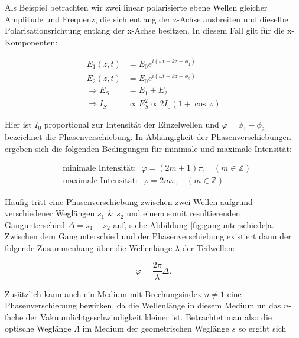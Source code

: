 \documentclass{article}
\begin{document}
Als Beispiel betrachten wir zwei linear polarisierte ebene Wellen gleicher Amplitude und Frequenz, die sich entlang der z-Achse ausbreiten und dieselbe Polarisationsrichtung entlang der x-Achse besitzen. In diesem Fall gilt für die x-Komponenten:

\begin{equation}
    \begin{split}
        E_1 (z, t) &= E_0 e^{i(\omega t - kz + \phi_1)} \\
        E_2 (z, t) &= E_0 e^{i(\omega t - kz + \phi_2)} \\
        \Rightarrow E_S &= E_1 + E_2 \\
        \Rightarrow I_S &\propto E_S^2 \propto 2 I_0 (1+ \cos{\varphi})
    \end{split}
\end{equation}

Hier ist $I_0$ proportional zur Intensität der Einzelwellen und $\varphi = \phi_1 - \phi_2$ bezeichnet die Phasenverschiebung. In Abhängigkeit der Phasenverschiebungen ergeben sich die folgenden Bedingungen für minimale und maximale Intensität:

\begin{equation}
    \begin{split}
        &\text{minimale Intensität:} \ \ \ \varphi = (2m+1) \pi, \ \ \ \ (m \in \mathbb{Z}) \\
        &\text{maximale Intensität:} \ \ \ \varphi = 2m \pi, \ \ \ \ (m \in \mathbb{Z})
    \end{split}
\end{equation}

Häufig tritt eine Phasenverschiebung zwischen zwei Wellen aufgrund verschiedener Weglängen $s_1$ \& $s_2$ und einem somit resultierenden Gangunterschied $\Delta = s_1 - s_2$ auf, siehe Abbildung \ref{fig:gangunterschiede}a. Zwischen dem Gangunterschied und der Phasenverschiebung existiert dann der folgende Zusammenhang über die Wellenlänge $\lambda$ der Teilwellen:

\begin{equation}
    \varphi = \frac{2 \pi}{\lambda} \Delta.
\end{equation}

Zusätzlich kann auch ein Medium mit Brechungsindex $n \neq 1$ eine Phasenverschiebung bewirken, da die  Wellenlänge in diesem Medium un das $n$-fache der Vakuumlichtgeschwindigkeit kleiner ist. Betrachtet man also die optische Weglänge $\Lambda$ im Medium der geometrischen Weglänge $s$ so ergibt sich
\end{document}
